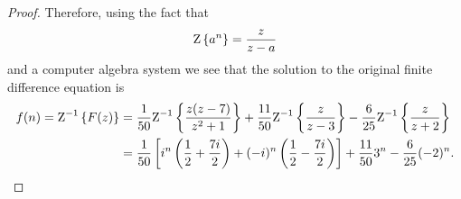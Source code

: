 \begin{proof}
  Therefore, using the fact that
  \begin{align*}
    \text{Z}\left\{ {a^n} \right\} = \frac{z}{z-a}
  \end{align*}
  and a computer algebra system we see that the solution to the original finite difference equation is
  \begin{align*}
    f(n) = \text{Z}^{-1}\left\{ {F(z)} \right\} &= \frac{1}{50}\text{Z}^{-1}\left\{ {\frac{z(z-7)}{z^2+1}} \right\}+\frac{11}{50}\text{Z}^{-1}\left\{ {\frac{z}{z-3}} \right\} - \frac{6}{25}\text{Z}^{-1}\left\{ {\frac{z}{z+2}} \right\} \\
    &= \frac{1}{50}\left[i^n\left(\frac{1}{2} + \frac{7i}{2}\right) + (-i)^n\left(\frac{1}{2}-\frac{7i}{2}\right)\right]
    + \frac{11}{50} 3^n - \frac{6}{25}(-2)^n.
  \end{align*}

\end{proof}
\newpage
